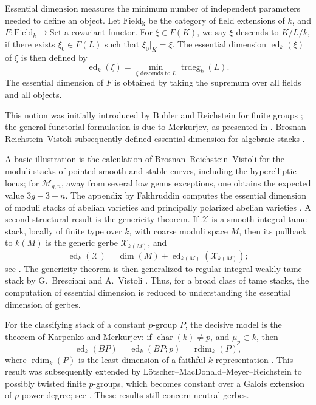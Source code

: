 \documentclass[11pt,reqno]{amsart}
\numberwithin{equation}{section}
\theoremstyle{plain}
\theoremstyle{definition}
\def\cM{{\mathcal M}}
\def\cX{{\mathcal X}}
\def\rdim{{\operatorname{rdim}}}
\def\ed{{\operatorname{ed}}}
\def\trdeg{{\operatorname{trdeg}}}
\begin{document}
Essential dimension measures the minimum number of independent parameters needed to define an object. Let $\mathrm{Field_k}$ be the category of field extensions of $k$, and $F:\mathrm{Field}_k\to \mathrm{Set}$ a covariant functor. For $\xi\in F(K)$, we say $\xi$ descends to $K/L/k$, if there exists $\xi_0\in F(L)$ such that $\xi_0|_K=\xi$. The essential dimension $\ed_k(\xi)$ of $\xi$ is then defined by
\[
\ed_k(\xi)=
\min_{\xi\text{ descends to }L}\trdeg_k(L).
\]
The essential dimension of $F$ is obtained by taking the supremum over all fields and all objects.

This notion was initially introduced by Buhler and Reichstein for finite groups \cite{BuhlerReichstein}; the general functorial formulation is due to Merkurjev, as presented in \cite{BerhuyFavi}. Brosnan--Reichstein--Vistoli subsequently defined essential dimension for algebraic stacks \cite[Definition~2.2]{BRV}. 

A basic illustration is the calculation of Brosnan--Reichstein--Vistoli
for the moduli stacks of pointed smooth and stable curves, including the
hyperelliptic locus; for $\cM_{g,n}$, away from several low genus
exceptions, one obtains the expected value $3g-3+n$. The appendix by
Fakhruddin computes the essential dimension of moduli stacks of abelian
varieties and principally polarized abelian varieties
\cite[Theorem~1.2, Theorem~7.2, and Theorem~A.1]{BRV}.  A second structural result is
the genericity theorem.  If $\cX$ is a smooth integral tame stack,
locally of finite type over $k$, with coarse moduli space $M$, then its
pullback to $k(M)$ is the generic gerbe $\cX_{k(M)}$, and
\[
\ed_k(\cX)
=\dim(M)+\ed_{k(M)}(\cX_{k(M)});
\]
see \cite[Theorem~6.1]{BRV}. The genericity theorem is then generalized to regular integral weakly tame stack by G.~Bresciani and A.~Vistoli
\cite[Introduction and Theorem~1.1]{BrescianiVistoliGeneric}.  Thus, for a
broad class of tame stacks, the computation of essential dimension is
reduced to understanding the essential dimension of gerbes. 

For the classifying stack of a constant $p$-group $P$, the decisive model is the theorem of Karpenko and Merkurjev: if $\operatorname{char}(k)
\ne p$, and $\mu_p\subset k$, then
\[
\ed_k(BP)=\ed_k(BP;p)=\rdim_k(P),
\]
where $\rdim_k(P)$ is the least dimension of a faithful
$k$-representation \cite[Theorem~4.1]{KM}. This result was subsequently extended by L\"otscher--MacDonald--Meyer--Reichstein to
possibly twisted finite $p$-groups, which becomes constant over a Galois extension of $p$-power degree; see \cite[Theorem~7.1]{LMMRTori}. These results still concern neutral gerbes. 
\end{document}
